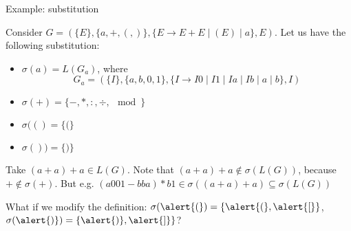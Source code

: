 \documentclass[handout]{beamer}
\begin{document}
\begin{frame}{Example: substitution}
    
    \begin{example}
    Consider $G=(\{E\},\{a,+,(,)\},\{E\rightarrow E+E\mid (E)\mid a\},E)$. Let us have the following substitution:
    \begin{itemize}
        \item $\sigma(a)=L(G_a)$, where 
        \vspace{-3pt}
        $$
        G_a=(\{I\},\{a,b,0,1\},\{I\rightarrow I0\mid I1\mid Ia\mid Ib\mid a\mid b\},I)
        $$
        \vspace{-18pt}
        \item $\sigma(+)=\{-,*,:, \div, \mod\}$
        \item $\sigma(()=\{(\}$
        \item $\sigma())=\{)\}$
    \end{itemize}
    \end{example}
    Take $(a+a)+a\in L(G)$. Note that $(a+a)+a \notin \sigma(L(G))$, because $+\notin\sigma(+)$. But e.g. $(a001-bba)*b1 \in \sigma((a+a)+a)\subseteq\sigma(L(G))$

    \smallskip

    What if we modify the definition: $\sigma(\alert{(})=\{\alert{(},\alert{[}\}$, $\sigma(\alert{)})=\{\alert{)},\alert{]}\}$?

\end{frame}
\end{document}
